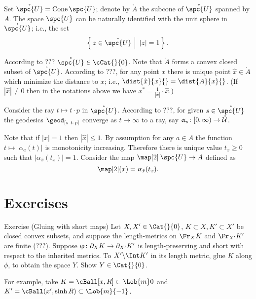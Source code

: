 Set $\mathring{\spc{U}}=\Cone \spc{U}$;
denote by $\mathring{A}$ the subcone of $\mathring{\spc{U}}$ spanned by $A$.
The space $\spc{U}$ can be naturally identified with the unit sphere in $\mathring{\spc{U}}$;
i.e., the set 
\[\set{z\in \mathring{\spc{U}}}{|z|=1}.\]

According to ??? $\mathring{\spc{U}}\in\cCat{}{0}$.
Note that $\mathring{A}$ forms a convex closed subset of $\mathring{\spc{U}}$.
According to ???, for any point $x$ there is unique point $\hat x\in \mathring{A}$
which minimize the distance to $x$;
i.e., $\dist{\hat x}{x}{}=\dist{A}{x}{}$.
(If $|\hat x|\ne0$ then in the notations above we have
$x^*=\tfrac1{|\hat x|}\cdot\hat x$.)

Consider the ray $t\mapsto t\cdot p$ in  $\mathring{\spc{U}}$.
According to ???, %
for given $s\in \mathring{\spc{U}}$
the geodesics $\geod_{[s\ t\cdot p]}$ converge as $t\to\infty$ to a ray, 
say $\alpha_s\:[0,\infty)\to \mathring{\spc{U}}$.



Note that if $|x|=1$ then $|\hat x|\le 1$.
By assumption for any $a\in A$ the function $t\mapsto |\alpha_a(t)|$ is monotonicity increasing.
Therefore there is unique value $t_x\ge 0$ such that
$|\alpha_{\hat x}(t_x)|=1$.
Consider the map $\map[2]\:\spc{U}\to A$
defined as 
\[\map[2](x)=\alpha_{\hat x}(t_x).\]











 
\section{Exercises}

\begin{thm}{Exercise} 
(Gluing with short maps)
 Let $X,X' \in\Cat{}{0}$, $K \subset X, K' \subset X'$ be closed convex subsets, 
and suppose the length-metrics on $\Fr_X K$ and $\Fr_{X'} K'$ are finite (???). 
Suppose $\phi\: \Fr_X K \to \Fr_{X'} K'$ is length-preserving and 
short with respect to the inherited
metrics. 
To $X'\backslash\Int K'$ in its length metric, 
glue $K$ along $\phi$, to obtain the space $Y$. 
Show $Y \in \Cat{}{0}$.

For example, take $K= \cBall[x,R]  \subset \Lob{m}0$ and $K' = \cBall(x',\sinh R)  \subset \Lob{m}{-1}$.
\end{thm}


